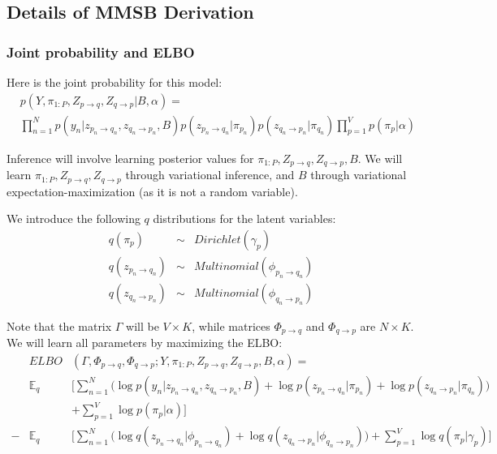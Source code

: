\subsection{Details of MMSB Derivation}
\label{sec:mmsb_appendix}

\subsubsection{Joint probability and ELBO}

Here is the joint probability for this model:
\begin{eqnarray*}
&p(Y, \pi_{1:P}, Z_{p \rightarrow q}, Z_{q \rightarrow p} | B, \alpha) = \\
&\prod_{n=1}^N p(y_n | z_{p_n \rightarrow q_n}, z_{q_n \rightarrow p_n} , B)
p(z_{p_n \rightarrow q_n} | \pi_{p_n}) p(z_{q_n \rightarrow p_n} | \pi_{q_n})
\prod_{p = 1}^V p(\pi_p| \alpha)
\end{eqnarray*}

Inference will involve learning posterior values for $\pi_{1:P}, Z_{p \rightarrow q}, Z_{q \rightarrow p}, B$.
We will learn $\pi_{1:P}, Z_{p \rightarrow q}, Z_{q \rightarrow p}$ through variational inference, and $B$ through variational expectation-maximization (as it is not a random variable).

We introduce the following $	q$ distributions for the latent variables:
\begin{eqnarray*}
q(\pi_p) &\sim& Dirichlet(\gamma_p) \\ 
q(z_{p_n \rightarrow q_n}) &\sim& Multinomial(\phi_{p_n \rightarrow q_n}) \\
q(z_{q_n \rightarrow p_n}) &\sim& Multinomial(\phi_{q_n \rightarrow p_n}) 
\end{eqnarray*}

Note that the matrix $\Gamma$ will be $V \times K$, while matrices $\Phi_{p \rightarrow q}$ and $\Phi_{q \rightarrow p}$ are $N \times K$.
We will learn all parameters by maximizing the ELBO:
\begin{eqnarray*}
&ELBO&(\Gamma,\Phi_{p \rightarrow q},\Phi_{q \rightarrow p};Y, \pi_{1:P}, Z_{p \rightarrow q}, Z_{q \rightarrow p},B,\alpha) = \\
&\mathbb{E}_q&\bigg[\sum_{n=1}^N \bigg(\log p(y_n | z_{p_n \rightarrow q_n}, z_{q_n \rightarrow p_n} , B)
+ \log p(z_{p_n \rightarrow q_n} | \pi_{p_n})
+ \log p(z_{q_n \rightarrow p_n} | \pi_{q_n})\bigg) \\
&&+ \sum_{p = 1}^V \log p(\pi_p| \alpha)\bigg] \\
- &\mathbb{E}_q&\bigg[\sum_{n=1}^N \bigg( \log q(z_{p_n \rightarrow q_n} | \phi_{p_n \rightarrow q_n})
+ \log q(z_{q_n \rightarrow p_n} | \phi_{q_n \rightarrow p_n})\bigg) 
+ \sum_{p = 1}^V \log q(\pi_p| \gamma_p)\bigg]
\end{eqnarray*}

